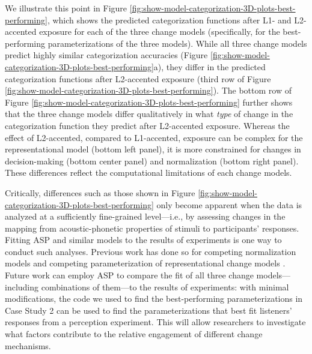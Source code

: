\documentclass[
  11pt,
  man,floatsintext]{apa6}
\begin{document}
We illustrate this point in Figure \ref{fig:show-model-categorization-3D-plots-best-performing}, which shows the predicted categorization functions after L1- and L2-accented exposure for each of the three change models (specifically, for the best-performing parameterizations of the three models). While all three change models predict highly similar categorization accuracies (Figure \ref{fig:show-model-categorization-3D-plots-best-performing}a), they differ in the predicted categorization functions after L2-accented exposure (third row of Figure \ref{fig:show-model-categorization-3D-plots-best-performing}). The bottom row of Figure \ref{fig:show-model-categorization-3D-plots-best-performing} further shows that the three change models differ qualitatively in what \emph{type} of change in the categorization function they predict after L2-accented exposure. Whereas the effect of L2-accented, compared to L1-accented, exposure can be complex for the representational model (bottom left panel), it is more constrained for changes in decision-making (bottom center panel) and normalization (bottom right panel). These differences reflect the computational limitations of each change models.

Critically, differences such as those shown in Figure \ref{fig:show-model-categorization-3D-plots-best-performing} only become apparent when the data is analyzed at a sufficiently fine-grained level---i.e., by assessing changes in the mapping from acoustic-phonetic properties of stimuli to participants' responses. Fitting ASP and similar models to the results of experiments is one way to conduct such analyses. Previous work has done so for competing normalization models \autocites[see, e.g.,][]{mcmurray-jongman2011,apfelbaum-mcmurray2015,persson-jaeger2022,richter2017,xie2021cognition} and competing parameterization of representational change models \autocites[e.g.,][]{kleinschmidt-jaeger2016cogsci,kleinschmidt2020,tan2022}. Future work can employ ASP to compare the fit of all three change models---including combinations of them---to the results of experiments: with minimal modifications, the code we used to find the best-performing parameterizations in Case Study 2 can be used to find the parameterizations that best fit listeners' responses from a perception experiment. This will allow researchers to investigate what factors contribute to the relative engagement of different change mechanisms.
\end{document}

